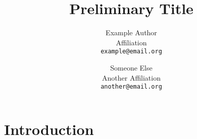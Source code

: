 \documentclass[a4paper,11pt]{article}
\title{Preliminary Title}
\date{}
\author{Example Author\\
	Affiliation\\
	\texttt{example@email.org}
	\and Someone Else\\
	Another Affiliation\\
	\texttt{another@email.org}
}
\begin{document}
\maketitle
\thispagestyle{empty}
\pagestyle{empty}

%
\section{Introduction}
%
%
%
%
%
\end{document}
